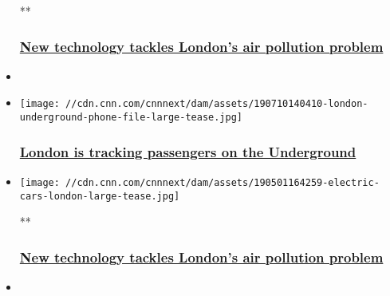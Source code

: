 \begin{itemize}
  **

  \hypertarget{new-technology-tackles-londons-air-pollution-problem}{%
  \subsubsection{\texorpdfstring{\href{/videos/business/2019/07/02/innovative-cities-london-air-pollution-foster-pkg.cnn}{New
  technology tackles London's air pollution
  problem}}{New technology tackles London's air pollution problem}}\label{new-technology-tackles-londons-air-pollution-problem}}
\item
\end{itemize}

\begin{itemize}
\item
  \href{/2019/07/12/tech/london-subway-tracking/index.html}{}

  \texttt{[image: //cdn.cnn.com/cnnnext/dam/assets/190710140410-london-underground-phone-file-large-tease.jpg]}

  \hypertarget{london-is-tracking-passengers-on-the-underground--1}{%
  \subsubsection{\texorpdfstring{\href{/2019/07/12/tech/london-subway-tracking/index.html}{London
  is tracking passengers on the Underground
  }}{London is tracking passengers on the Underground }}\label{london-is-tracking-passengers-on-the-underground--1}}
\item
  \href{/videos/business/2019/07/02/innovative-cities-london-air-pollution-foster-pkg.cnn}{}

  \texttt{[image: //cdn.cnn.com/cnnnext/dam/assets/190501164259-electric-cars-london-large-tease.jpg]}

  **

  \hypertarget{new-technology-tackles-londons-air-pollution-problem-1}{%
  \subsubsection{\texorpdfstring{\href{/videos/business/2019/07/02/innovative-cities-london-air-pollution-foster-pkg.cnn}{New
  technology tackles London's air pollution
  problem}}{New technology tackles London's air pollution problem}}\label{new-technology-tackles-londons-air-pollution-problem-1}}
\item
  \href{/2019/06/26/business/ikea-affordable-housing/index.html}{}


\end{itemize}
